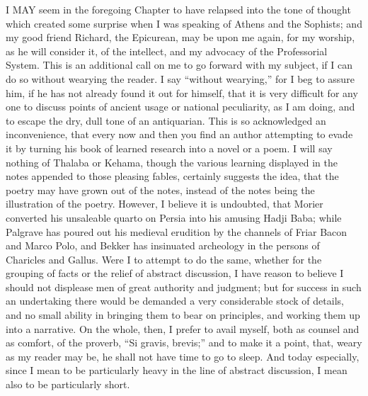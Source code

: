 I MAY
seem in the foregoing Chapter to have relapsed into the tone of
thought which created some surprise when I was speaking of Athens and
the Sophists; and my good friend Richard, the Epicurean, may be upon
me again, for my worship, as he will consider it, of the intellect,
and my advocacy of the Professorial System. This is an additional call
on me to go forward with my subject, if I can do so without wearying
the reader. I say ``without wearying,'' for I beg to assure him, if
he has not already found it out for himself, that it is very difficult
for any one to discuss points of ancient usage or national
peculiarity, as I am doing, and to escape the dry, dull tone of an
antiquarian. This is so acknowledged an inconvenience, that every now
and then you find an author attempting to evade it by turning his book
of learned research into a novel or a poem. I will say nothing of
Thalaba or Kehama, though the various learning displayed in the notes
appended to those pleasing fables, certainly suggests the idea, that
the poetry may have grown out of the notes, instead of the notes being
the illustration of the poetry. However, I believe it is undoubted,
that Morier converted his unsaleable quarto on Persia into his amusing
Hadji Baba; while Palgrave has poured out his medieval erudition by
the channels of Friar Bacon and Marco Polo, and Bekker has
insinuated archeology in the persons of Charicles and Gallus. Were I
to attempt to do the same, whether for the grouping of facts or the
relief of abstract discussion, I have reason to believe I should not
displease men of great authority and judgment; but for success in such
an undertaking there would be demanded a very considerable stock of
details, and no small ability in bringing them to bear on principles,
and working them up into a narrative. On the whole, then, I prefer to
avail myself, both as counsel and as comfort, of the proverb, ``Si
gravis, brevis;'' and to make it a point, that, weary as my reader
may be, he shall not have time to go to sleep. And today especially,
since I mean to be particularly heavy in the line of abstract
discussion, I mean also to be particularly short.

